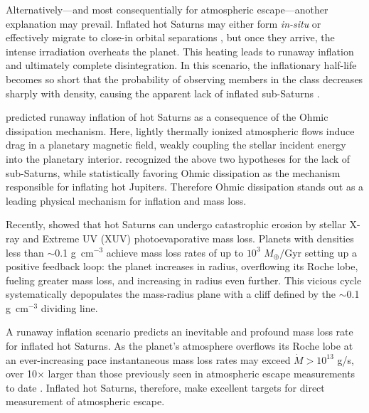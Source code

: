 \documentclass[twocolumn]{aastex631}
\begin{document}
Alternatively---and most consequentially for atmospheric escape---another explanation may prevail.  Inflated hot Saturns may either form \emph{in-situ} or effectively migrate to close-in orbital separations \citep{2018ARA&A..56..175D}, but once they arrive, the intense irradiation overheats the planet.  This heating leads to runaway inflation and ultimately complete disintegration.  In this scenario, the inflationary half-life becomes so short that the probability of observing members in the class decreases sharply with density, causing the apparent lack of inflated sub-Saturns \citep{2023ApJ...945L..36T}.

\citet{2011ApJ...738....1B} predicted runaway inflation of hot Saturns as a consequence of the Ohmic dissipation mechanism.  Here, lightly thermally ionized atmospheric flows induce drag in a planetary magnetic field, weakly coupling the stellar incident energy into the planetary interior.  \citet{2018AJ....155..214T} recognized the above two hypotheses for the lack of sub-Saturns, while statistically favoring Ohmic dissipation as the mechanism responsible for inflating hot Jupiters.  Therefore Ohmic dissipation stands out as a leading physical mechanism for inflation and mass loss.

Recently, \citet{2023ApJ...945L..36T} showed that hot Saturns can undergo catastrophic erosion by stellar X-ray and Extreme UV (XUV) photoevaporative mass loss. Planets with densities less than $\sim$0.1 g~cm$^{-3}$ achieve mass loss rates of up to $10^3$ $M_\oplus /$Gyr setting up a positive feedback loop: the planet increases in radius, overflowing its Roche lobe, fueling greater mass loss, and increasing in radius even further.  This vicious cycle systematically depopulates the mass-radius plane with a cliff defined by the $\sim$0.1 g~cm$^{-3}$ dividing line.

A runaway inflation scenario predicts an inevitable and profound mass loss rate for inflated hot Saturns.  As the planet's atmosphere overflows its Roche lobe at an ever-increasing pace instantaneous mass loss rates may exceed $\dot{M}>10^{13}$ g/s, over 10$\times$ larger than those previously seen in atmospheric escape measurements to date \citep{2022arXiv221116243D}.  Inflated hot Saturns, therefore, make excellent targets for direct measurement of atmospheric escape.  
\end{document}

